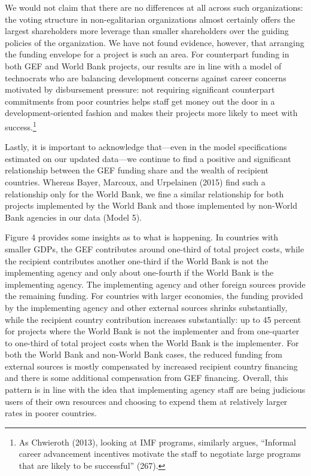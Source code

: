 \documentclass{article}
\begin{document}
We would not claim that there are no differences at all across such organizations: the voting structure in non-egalitarian organizations almost certainly offers the largest shareholders more leverage than smaller shareholders over the guiding policies of the organization.  We have not found evidence, however, that arranging the funding envelope for a project is such an area.  For counterpart funding in both GEF and World Bank projects, our results are in line with a model of technocrats who are balancing development concerns against career concerns motivated by disbursement pressure: not requiring significant counterpart commitments from poor countries helps staff get money out the door in a development-oriented fashion and makes their projects more likely to meet with success.\footnote{As Chwieroth (2013), looking at IMF programs, similarly argues, “Informal career advancement incentives motivate the staff to negotiate large programs that are likely to be successful” (267).} 
  
Lastly, it is important to acknowledge that––even in the model specifications estimated on our updated data––we continue to find a positive and significant relationship between the GEF funding share and the wealth of recipient countries.  Whereas Bayer, Marcoux, and Urpelainen (2015) find such a relationship only for the World Bank, we fine a similar relationship for both projects implemented by the World Bank and those implemented by non-World Bank agencies in our data (Model 5).  

Figure 4 provides some insights as to what is happening.  In countries with smaller GDPs, the GEF contributes around one-third of total project costs, while the recipient contributes another one-third if the World Bank is not the implementing agency and only about one-fourth if the World Bank is the implementing agency.  The implementing agency and other foreign sources provide the remaining funding.  For countries with larger economies, the funding provided by the implementing agency and other external sources shrinks substantially, while the recipient country contribution increases substantially: up to 45 percent for projects where the World Bank is not the implementer and from one-quarter to one-third of total project costs when the World Bank is the implementer.  For both the World Bank and non-World Bank cases, the reduced funding from external sources is mostly compensated by increased recipient country financing and there is some additional compensation from GEF financing.  Overall, this pattern is in line with the idea that implementing agency staff are being judicious users of their own resources and choosing to expend them at relatively larger rates in poorer countries. 
\end{document}

